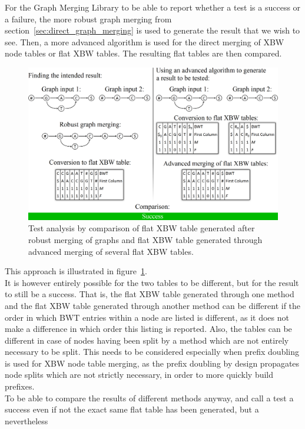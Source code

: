 \documentclass[a4paper,12pt,twoside,BCOR=10mm]{scrbook}
\begin{document}
For the Graph Merging Library to be able to report whether a test is a success or 
a failure, the more robust graph merging from section~\ref{sec:direct_graph_merging} 
is used to generate the result that we 
wish to see. Then, a more advanced algorithm is used for the direct merging 
of XBW node tables or flat XBW tables. 
The resulting flat tables are then compared. 
\begin{figure}[!htb]
\centering
\includegraphics[width=\textwidth]{evo_test_comparison.png}
\caption[Test analysis]{Test analysis by comparison of flat XBW table generated after robust merging of graphs and flat XBW table generated through advanced merging of several flat XBW tables.} \label{fig:evo_test_comparison}
\end{figure}
This approach is illustrated in figure~\ref{fig:evo_test_comparison}. \\
It is however entirely possible for the two tables to be different, but for the result to 
still be a success. That is, the flat XBW table generated through one method and the 
flat XBW table generated through another method can be different if the order in which BWT 
entries within a node are listed is different, as it does not make a difference in which order 
this listing is reported. Also, the tables can be different in case of nodes having been split 
by a method which are not entirely necessary to be split. 
This needs to be considered especially when prefix doubling is used for XBW node table merging, 
as the prefix doubling by design propagates node splits which are not strictly necessary, 
in order to more quickly build prefixes. \\
To be able to compare the results of different methods anyway, and call a test 
a success even if not the exact same flat table has been generated, but a nevertheless 
\end{document}

